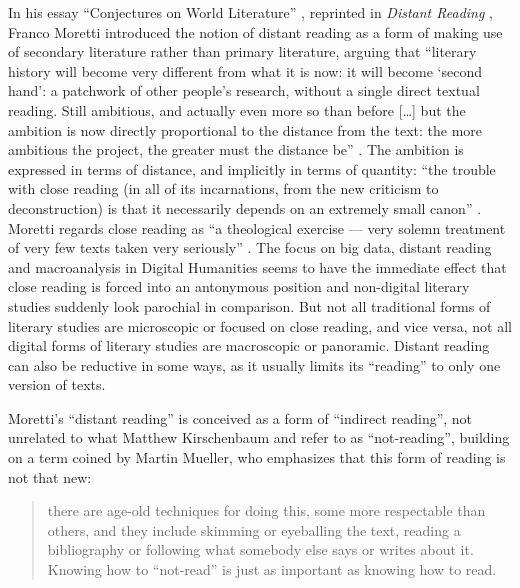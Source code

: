 \begin{paper}
In his essay ``Conjectures on World Literature'' \citeyearpar{moretti_conjectures_2000}, reprinted in
\emph{Distant Reading} \citeyearpar{moretti_distant_2013}, Franco Moretti introduced the notion of
distant reading as a form of making use of secondary literature rather
than primary literature, arguing that ``literary history will become
very different from what it is now: it will become `second hand': a
patchwork of other people's research, without a single direct textual
reading. Still ambitious, and actually even more so than before
{[}\ldots{}{]} but the ambition is now directly proportional to the
distance from the text: the more ambitious the project, the greater must
the distance be'' \citep[48]{moretti_distant_2013}. The ambition is expressed in terms
of distance, and implicitly in terms of quantity: ``the trouble with
close reading (in all of its incarnations, from the new criticism to
deconstruction) is that it necessarily depends on an extremely small
canon'' \citep[57]{moretti_conjectures_2000}. Moretti regards close reading as ``a
theological exercise --- very solemn treatment of very few texts taken
very seriously'' \citep[57]{moretti_conjectures_2000}. The focus on big data, distant reading and
macroanalysis in Digital Humanities seems to have the immediate effect
that close reading is forced into an antonymous position and non-digital
literary studies suddenly look parochial in comparison. But not all
traditional forms of literary studies are microscopic or focused on
close reading, and vice versa, not all digital forms of literary studies
are macroscopic or panoramic. Distant reading can also be reductive in
some ways, as it usually limits its ``reading'' to only one version of
texts.

Moretti's ``distant reading'' is conceived as a form of ``indirect
reading'', not unrelated to what Matthew Kirschenbaum \citeyearpar{kirschenbaum_remaking_2007} and
\citealt{kestemont_kunnen_2019} refer to as ``not-reading'', building on a term
coined by Martin Mueller, who emphasizes that this form of reading is
not that new:

\begin{quote}
there are age-old techniques for doing this, some more respectable than
others, and they include skimming or eyeballing the text, reading a
bibliography or following what somebody else says or writes about it.
Knowing how to ``not-read'' is just as important as knowing how to read.
\begin{flushright}
\citep[Mueller, qtd. in][n.p.]{kirschenbaum_remaking_2007}
\end{flushright}
\end{quote}


\end{paper}
